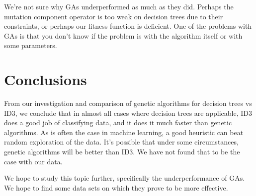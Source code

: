 \documentclass[12pt, letterpaper]{article}
\begin{document}
We're not sure why GAs underperformed as much as they did. Perhaps the mutation component operator is too weak on decision trees due to their constraints, or perhaps our fitness function is deficient. One of the problems with GAs is that you don't know if the problem is with the algorithm itself or with some parameters.


\section{Conclusions}
From our investigation and comparison of genetic algorithms for decision trees vs ID3, we conclude that in almost all cases where decision trees are applicable, ID3 does a good job of classifying data, and it does it much faster than genetic algorithms. As is often the case in machine learning, a good heuristic can beat random exploration of the data. It's possible that under some circumstances, genetic algorithms will be better than ID3. We have not found that to be the case with our data.

We hope to study this topic further, specifically the underperformance of GAs. We hope to find some data sets on which they prove to be more effective.





\end{document}
